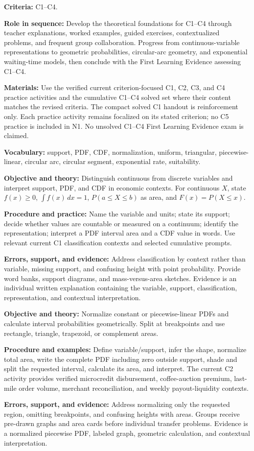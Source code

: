 \documentclass[10pt,letterpaper]{article}
\newcommand{\labelled}[2]{\textbf{#1:} #2\par}
\newcommand{\plansection}[1]{\Needspace{8\baselineskip}\par\vspace{8pt}{\large\bfseries #1\par}\vspace{3pt}}
\newcommand{\plansubsection}[1]{\Needspace{7\baselineskip}\par\vspace{5pt}{\normalsize\bfseries #1\par}\vspace{1pt}}
\newcommand{\criterionpart}[1]{\Needspace{10\baselineskip}\par\vspace{4pt}{\bfseries #1\par}}
\begin{document}
	\plansection{5. Experience: Three Pedagogical Actions}
	
	\plansubsection{Pedagogical Action N1 -- Foundations of Continuous Probability}
	\labelled{Criteria}{C1--C4.}
	\labelled{Role in sequence}{Develop the theoretical foundations for C1--C4 through teacher explanations, worked examples, guided exercises, contextualized problems, and frequent group collaboration. Progress from continuous-variable representations to geometric probabilities, circular-arc geometry, and exponential waiting-time models, then conclude with the First Learning Evidence assessing C1--C4.}
	\labelled{Materials}{Use the verified current criterion-focused C1, C2, C3, and C4 practice activities and the cumulative C1--C4 solved set where their content matches the revised criteria. The compact solved C1 handout is reinforcement only. Each practice activity remains focalized on its stated criterion; no C5 practice is included in N1. No unsolved C1--C4 First Learning Evidence exam is claimed.}
	\labelled{Vocabulary}{support, PDF, CDF, normalization, uniform, triangular, piecewise-linear, circular arc, circular segment, exponential rate, suitability.}
	
	\criterionpart{C1 -- Continuous variables, support, PDF, and CDF}
	\labelled{Objective and theory}{Distinguish continuous from discrete variables and interpret support, PDF, and CDF in economic contexts. For continuous $X$, state $f(x)\ge0$, $\int f(x)\,dx=1$, $P(a\le X\le b)$ as area, and $F(x)=P(X\le x)$.}
	\labelled{Procedure and practice}{Name the variable and units; state its support; decide whether values are countable or measured on a continuum; identify the representation; interpret a PDF interval area and a CDF value in words. Use relevant current C1 classification contexts and selected cumulative prompts.}
	\labelled{Errors, support, and evidence}{Address classification by context rather than variable, missing support, and confusing height with point probability. Provide word banks, support diagrams, and mass-versus-area sketches. Evidence is an individual written explanation containing the variable, support, classification, representation, and contextual interpretation.}
	
	\criterionpart{C2 -- Uniform, triangular, constant, and piecewise-linear densities}
	\labelled{Objective and theory}{Normalize constant or piecewise-linear PDFs and calculate interval probabilities geometrically. Split at breakpoints and use rectangle, triangle, trapezoid, or complement areas.}
	\labelled{Procedure and examples}{Define variable/support, infer the shape, normalize total area, write the complete PDF including zero outside support, shade and split the requested interval, calculate its area, and interpret. The current C2 activity provides verified microcredit disbursement, coffee-auction premium, last-mile order volume, merchant reconciliation, and weekly payout-liquidity contexts.}
	\labelled{Errors, support, and evidence}{Address normalizing only the requested region, omitting breakpoints, and confusing heights with areas. Groups receive pre-drawn graphs and area cards before individual transfer problems. Evidence is a normalized piecewise PDF, labeled graph, geometric calculation, and contextual interpretation.}
	
\end{document}
